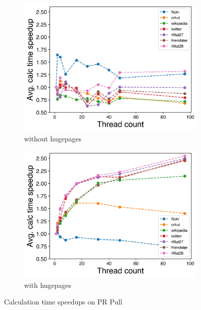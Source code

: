 \documentclass{meetings}
\begin{document}
\begin{figure}
	\hfil
	\begin{subfigure}{0.48\columnwidth}
		\includegraphics[width=\linewidth]{../../plots/singleNodePRPullGaloisThreads.png}
		\caption{without hugepages}
		\label{fig:galoisSpeedupPRPull_noHP}
	\end{subfigure}
	\begin{subfigure}{0.48\columnwidth}
		\includegraphics[width=\linewidth]{../../plots/singleNodePRPullGaloisHPThreads.png}
		\caption{with hugepages}
		\label{fig:galoisSpeedupPRPull_HP}
	\end{subfigure}
	\hfil
	\caption{Calculation time speedups on PR Pull}
	\label{fig:galoisSpeedupPRPull}
\end{figure}
\end{document}
